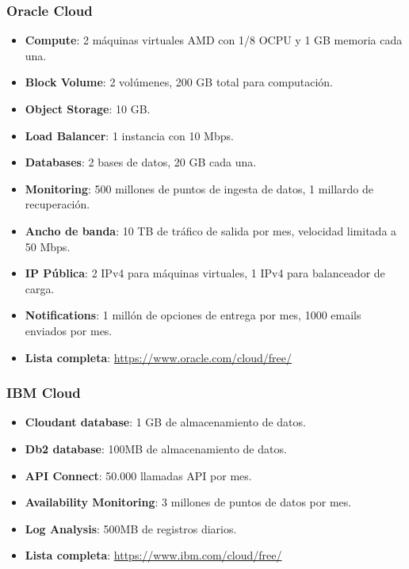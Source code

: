 \subsubsection*{Oracle Cloud}
\begin{itemize}
	\item \textbf{Compute}: 2 máquinas virtuales AMD con 1/8 OCPU y 1 GB memoria cada una.
	\item \textbf{Block Volume}: 2 volúmenes, 200 GB total para computación.
	\item \textbf{Object Storage}: 10 GB.
	\item \textbf{Load Balancer}: 1 instancia con 10 Mbps.
	\item \textbf{Databases}: 2 bases de datos, 20 GB cada una.
	\item \textbf{Monitoring}: 500 millones de puntos de ingesta de datos, 1 millardo de recuperación.
	\item \textbf{Ancho de banda}: 10 TB de tráfico de salida por mes, velocidad limitada a 50 Mbps.
	\item \textbf{IP Pública}: 2 IPv4 para máquinas virtuales, 1 IPv4 para balanceador de carga.
	\item \textbf{Notifications}: 1 millón de opciones de entrega por mes, 1000 emails enviados por mes.
	\item \textbf{Lista completa}: \url{https://www.oracle.com/cloud/free/}
\end{itemize}

\subsubsection*{IBM Cloud}
\begin{itemize}
	\item \textbf{Cloudant database}: 1 GB de almacenamiento de datos.
	\item \textbf{Db2 database}: 100MB de almacenamiento de datos.
	\item \textbf{API Connect}: 50.000 llamadas API por mes.
	\item \textbf{Availability Monitoring}: 3 millones de puntos de datos por mes.
	\item \textbf{Log Analysis}: 500MB de registros diarios.
	\item \textbf{Lista completa}: \url{https://www.ibm.com/cloud/free/}
\end{itemize}

